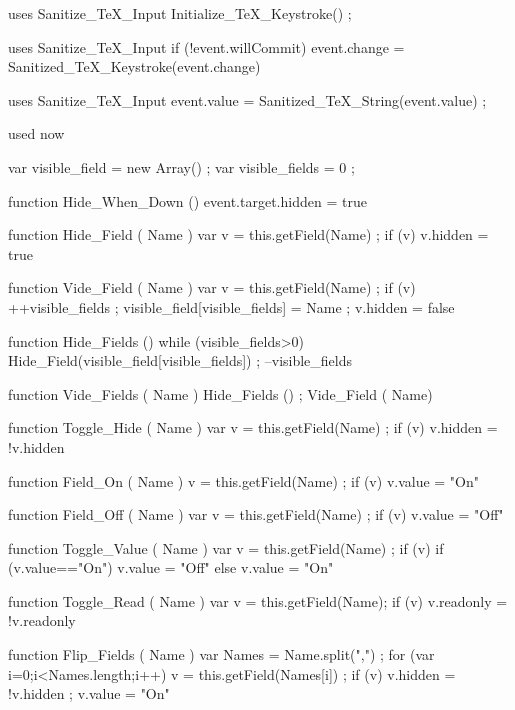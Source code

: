\stopJSpreamble

 uses {Sanitize_TeX_Input}
  Initialize_TeX_Keystroke() ; 
\stopJScode

 uses {Sanitize_TeX_Input}
  if (!event.willCommit) 
    { event.change = Sanitized_TeX_Keystroke(event.change) }
\stopJScode

 uses {Sanitize_TeX_Input}
  event.value = Sanitized_TeX_String(event.value) ; 
\stopJScode

 used now 

var visible_field  = new Array() ; %
var visible_fields = 0 ; 

function Hide_When_Down ()
  { event.target.hidden = true }

function Hide_Field ( Name ) 
  { var v = this.getField(Name) ; 
    if (v) 
      { %
        v.hidden = true } }

function Vide_Field ( Name ) 
  { var v = this.getField(Name) ;   
    if (v) 
      { ++visible_fields ; 
        visible_field[visible_fields] = Name ;  
        v.hidden = false } } 

function Hide_Fields () 
  { while (visible_fields>0)
      { Hide_Field(visible_field[visible_fields]) ;
        --visible_fields } } 

function Vide_Fields ( Name ) %
  { Hide_Fields () ; 
    Vide_Field ( Name) } 

function Toggle_Hide ( Name ) 
  { var v = this.getField(Name) ; 
    if (v) { v.hidden = !v.hidden } } 

function Field_On ( Name ) 
  { v = this.getField(Name) ; 
    if (v) { v.value = "On" } } 

function Field_Off ( Name ) 
  { var v = this.getField(Name) ; 
    if (v) { v.value = "Off" } }

function Toggle_Value ( Name ) 
  { var v = this.getField(Name) ;
    if (v) 
      { if (v.value=="On") 
          { v.value = "Off" }
        else 
          { v.value = "On" } } }

function Toggle_Read ( Name ) 
  { var v = this.getField(Name);   
    if (v) { v.readonly = !v.readonly } }

function Flip_Fields ( Name ) 
  { var Names = Name.split(",") ;
    for (var i=0;i<Names.length;i++)
      { v = this.getField(Names[i]) ; 
        if (v)  
          { v.hidden = !v.hidden ;
            v.value = "On" } } }

